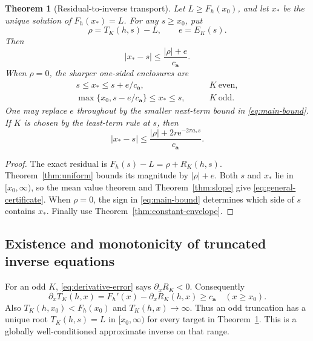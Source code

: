 \documentclass[11pt,a4paper]{article}
\numberwithin{equation}{section}
\newtheorem{theorem}{Theorem}[section]
\theoremstyle{definition}\newtheorem{definition}[theorem]{Definition}
\theoremstyle{remark}\newtheorem{remark}[theorem]{Remark}
\newcommand{\e}{\mathrm e}
\newcommand{\avec}{\boldsymbol a}
\newcommand{\amin}{a_*}
\begin{document}
\begin{theorem}[Residual-to-inverse transport]
\label{thm:certificate}
Let $L\ge F_h(x_0)$, and let $x_*$ be the unique solution of $F_h(x_*)=L$.
For any $s\ge x_0$, put
\begin{equation}
 \rho=T_K(h,s)-L,\qquad e=E_K(s).
\end{equation}
Then
\begin{equation}
 |x_*-s|\le\frac{|\rho|+e}{c_{\avec}}.
 \label{eq:general-certificate}
\end{equation}
When $\rho=0$, the sharper one-sided enclosures are
\begin{align}
 s\le x_*\le s+e/c_{\avec},&\qquad K\ \text{even},\label{eq:inverse-even}\\
 \max\{x_0,s-e/c_{\avec}\}\le x_*\le s,&\qquad K\ \text{odd}.
 \label{eq:inverse-odd}
\end{align}
One may replace $e$ throughout by the smaller next-term bound in
\eqref{eq:main-bound}. If $K$ is chosen by the least-term rule at $s$, then
\begin{equation}
 |x_*-s|\le\frac{|\rho|+2r\e^{-2\pi\amin s}}
                    {c_{\avec}}.
 \label{eq:inverse-exp}
\end{equation}
\end{theorem}
\begin{proof}
The exact residual is $F_h(s)-L=\rho+R_K(h,s)$. Theorem~\ref{thm:uniform}
bounds its magnitude by $|\rho|+e$. Both $s$ and $x_*$ lie in $[x_0,\infty)$,
so the mean value theorem and Theorem~\ref{thm:slope} give
\eqref{eq:general-certificate}. When $\rho=0$, the sign in
\eqref{eq:main-bound} determines which side of $s$ contains $x_*$. Finally use
Theorem~\ref{thm:constant-envelope}.
\end{proof}

\subsection{Existence and monotonicity of truncated inverse equations}
For an odd $K$, \eqref{eq:derivative-error} says $\partial_xR_K<0$.
Consequently
\begin{equation}
 \partial_xT_K(h,x)=F_h'(x)-\partial_xR_K(h,x)\ge c_{\avec}
 \quad(x\ge x_0).
\end{equation}
Also $T_K(h,x_0)<F_h(x_0)$ and $T_K(h,x)\to\infty$. Thus an odd truncation
has a unique root $T_K(h,s)=L$ in $[x_0,\infty)$ for every target in
Theorem~\ref{thm:certificate}. This is a globally well-conditioned approximate
inverse on that range.
\end{document}

